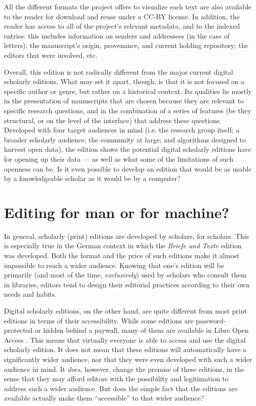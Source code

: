 \begin{paper}
All the different formats the project offers to visualize each text are also available to the reader for download and reuse
under a CC-BY license. In addition, the reader has access to all of the project's
relevant metadata, and to the indexed entries: this includes information on senders and
addressees (in the case of letters); the manuscript's origin, provenance, and current holding
repository; the editors that were involved, etc.

Overall, this edition is not radically different from the major current
digital scholarly editions. What may set it apart, though, is that it is not
focused on a specific author or genre, but rather on a historical context. Its
 qualities lie mostly in the presentation of manuscripts that are chosen because they are
relevant to specific research questions, and in the combination of a
series of features (be they structural, or on the level of the interface)
that address these questions. Developed with four target audiences in mind
(i.e. the research group itself; a broader scholarly audience; the community at
large; and algorithms designed to harvest open data), the edition shows the potential
digital scholarly editions have for opening up their data --- as well as what some of the limitations of such openness can be. Is it even possible to develop
an edition that would be as usable by a knowledgeable scholar as it would be by
a computer?

\section{Editing for man or for machine?}

In general, scholarly (print) editions are developed by scholars, for
scholars. This is especially true in the German context in which the
\emph{Briefe und Texte} edition was developed. Both the format and the price of such editions
make it almost impossible to reach a wider audience. Knowing that one's
edition will be primarily (and most of the time, \emph{exclusively}) used by
scholars who consult them in libraries, editors tend to design their
editorial practices according to their own needs and habits.

Digital scholarly editions, on the other hand, are quite different from most print
editions in terms of their accessibility. While some editions are
password-protected or hidden behind a paywall, many of them are
available in Libre Open Access \citep{suber_open_2012}. This means that virtually everyone is able to
access and use the digital scholarly edition. It does not mean that these editions will automatically have a
significantly wider audience, nor that they were even
developed with such a wider audience in mind. It \emph{does}, however, change the premise of these editions,
in the sense that they may afford editors with the possibility and legitimation to address such a wider audience. But
does the simple fact that the editions are available actually make them
``accessible'' to that wider audience?


\end{paper}
